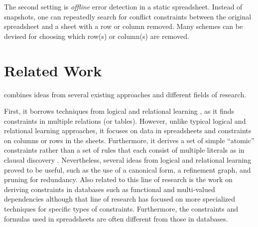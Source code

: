 The second setting is \textit{offline} error detection in a static spreadsheet.
Instead of snapshots, one can repeatedly search for conflict constraints between the original spreadsheet and a sheet with a row or column removed. Many schemes can be devised for choosing which row(s) or column(s) are removed.


\section{Related Work}\label{sec:related_work}
\sname combines ideas from several existing
approaches and different fields of research.


First, it borrows techniques from logical and relational learning \cite{luc_book}, as it finds
constraints in multiple relations (or tables). However, unlike typical logical and relational learning
approaches, it focuses on data in spreadsheets and constraints on columns or rows in the sheets.
Furthermore, it derives a set of simple “atomic” constraints rather than a set of rules that each consist of multiple literals as in clausal discovery \cite{claudien,lallouet}. Nevertheless, several ideas from logical and relational learning
proved to be useful, such as the use of a canonical form, a refinement graph, and pruning for redundancy.
Also related to this line of research is the work on deriving constraints in databases such as functional and multi-valued dependencies \cite{savnik, Mannila-Raiha}
although that line of research has focused on more specialized techniques for specific types of constraints. Furthermore, the constraints and formulas used
in spreadsheets are often different from those in databases.


